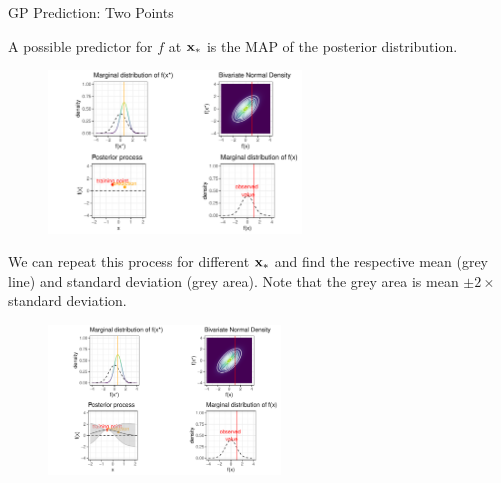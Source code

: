 \begin{frame}[c,allowframebreaks]{GP Prediction: Two Points}
\framebreak

A possible predictor for $f$ at $\mathbf{x}_*$ is the MAP of the posterior distribution.


\begin{figure}
\includegraphics[width=0.6\textwidth]{figure/gp-posterior-6-1.pdf}\par
\end{figure}


\framebreak

We can repeat this process for different $\mathbf{x}_*$ and find the respective mean (grey line) and standard deviation (grey area). Note that the grey area is mean $\pm 2 \times$ standard deviation.


\begin{figure}
\includegraphics[width=0.55\textwidth]{figure/gp-posterior-7-1.pdf}\par
\end{figure}


\end{frame}

